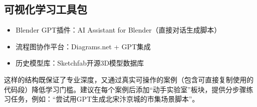 \hypertarget{ux53efux89c6ux5316ux5b66ux4e60ux5de5ux5177ux5305}{%
\subsection{可视化学习工具包}\label{ux53efux89c6ux5316ux5b66ux4e60ux5de5ux5177ux5305}}

\begin{itemize}

\item
  Blender GPT插件：AI Assistant for Blender（直接对话生成脚本）
\item
  流程图协作平台：Diagrams.net + GPT集成
\item
  历史模型库：Sketchfab开源3D模型数据库
\end{itemize}



这样的结构既保证了专业深度，又通过真实可操作的案例（包含可直接复制使用的代码段）降低学习门槛。建议在每个案例后添加``动手实验室''板块，提供分步骤练习任务，例如：``尝试用GPT生成北宋汴京城的市集场景脚本''。